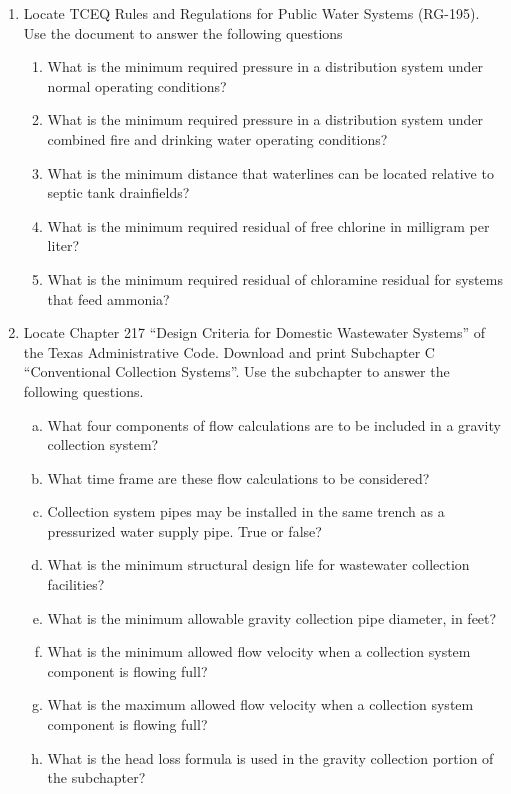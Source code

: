 \documentclass[12pt]{article}
\begin{document}
\begin{enumerate}
\item Locate TCEQ Rules and Regulations for Public Water Systems (RG-195).    Use the document to answer the following questions
\begin{enumerate}
\item  What is the minimum required pressure in a distribution system under normal operating conditions?
\item What is the minimum required pressure in a distribution system under combined fire and drinking water operating conditions?
\item What is the minimum distance that waterlines can be located relative to septic tank drainfields?
\item What is the minimum required residual of free chlorine in milligram per liter?
\item What is the minimum required residual of chloramine residual for systems that feed ammonia?
\end{enumerate}
\item Locate Chapter 217 ``Design Criteria for Domestic Wastewater Systems'' of the Texas Administrative Code.   Download and print Subchapter C ``Conventional Collection Systems''.   Use the subchapter to answer the following questions.
\begin{enumerate}[a)]
\item What four components of flow calculations are to be included in a gravity collection system?
\item What time frame are these flow calculations to be considered?
\item Collection system pipes may be installed in the same trench as a pressurized water supply pipe.  True or false?
\item What is the minimum structural design life for wastewater collection facilities?
\item What is the minimum allowable gravity collection pipe diameter, in feet?
\item What is the minimum allowed flow velocity when a collection system component is flowing full?
\item What is the maximum allowed flow velocity when a collection system component is flowing full?
\item What is the head loss formula is used in the gravity collection portion of the subchapter?

\end{enumerate}
\end{enumerate}
\end{document}
